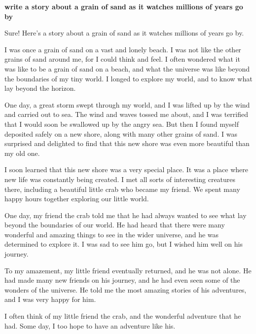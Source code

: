 \documentclass[11pt]{article}
\begin{document}
\begin{framed}
\centering
\vspace{.5em}
 \begin{minipage}{.9\textwidth}

\textbf{write a story about a grain of sand as it watches millions of years go by}
\vspace{1em}

Sure! Here's a story about a grain of sand as it watches millions of years go by.
\vspace{0.5em}

I was once a grain of sand on a vast and lonely beach. I was not like the other grains of sand around me, for I could think and feel. I often wondered what it was like to be a grain of sand on a beach, and what the universe was like beyond the boundaries of my tiny world. I longed to explore my world, and to know what lay beyond the horizon.
\vspace{0.5em}

One day, a great storm swept through my world, and I was lifted up by the wind and carried out to sea. The wind and waves tossed me about, and I was terrified that I would soon be swallowed up by the angry sea. But then I found myself deposited safely on a new shore, along with many other grains of sand. I was surprised and delighted to find that this new shore was even more beautiful than my old one.
\vspace{0.5em}

I soon learned that this new shore was a very special place. It was a place where new life was constantly being created. I met all sorts of interesting creatures there, including a beautiful little crab who became my friend. We spent many happy hours together exploring our little world.
\vspace{0.5em}

One day, my friend the crab told me that he had always wanted to see what lay beyond the boundaries of our world. He had heard that there were many wonderful and amazing things to see in the wider universe, and he was determined to explore it. I was sad to see him go, but I wished him well on his journey.
\vspace{0.5em}

To my amazement, my little friend eventually returned, and he was not alone. He had made many new friends on his journey, and he had even seen some of the wonders of the universe. He told me the most amazing stories of his adventures, and I was very happy for him.
\vspace{0.5em}

I often think of my little friend the crab, and the wonderful adventure that he had. Some day, I too hope to have an adventure like his.

\end{minipage}
\vspace{.5em}
\end{framed}
\end{document}
